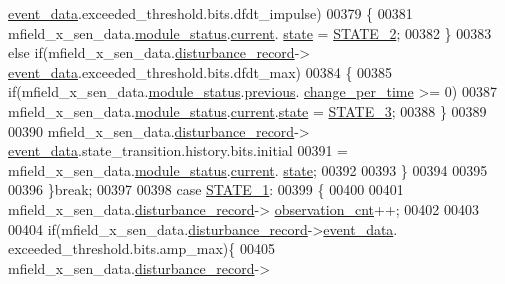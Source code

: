 \begin{DoxyCode}
      \hyperlink{a00028_a8c0bda69e71ef674e60da47ad0be9ab0}{event\_data}.exceeded\_threshold.bits.dfdt\_impulse)
00379              \{
00381                  mfield\_x\_sen\_data.\hyperlink{a00025_adfab5a5d8b45a93dfb13edb24e2b80e3}{module\_status}.\hyperlink{a00019_acf41ffc11da291c2f9f0fcb02ee72b98}{current}.
      \hyperlink{a00019_a6b8d8e916bc56265a3fd279bd26b6d1b}{state} = \hyperlink{a00021_a66fa48e832a64af4d405511cecc4c752}{STATE\_2};
00382              \}
00383              \textcolor{keywordflow}{else} \textcolor{keywordflow}{if}(mfield\_x\_sen\_data.\hyperlink{a00025_ac9b38e2c1d3f1013a88d33506c754152}{disturbance\_record}->
      \hyperlink{a00028_a8c0bda69e71ef674e60da47ad0be9ab0}{event\_data}.exceeded\_threshold.bits.dfdt\_max)
00384              \{
00385                  \textcolor{keywordflow}{if}(mfield\_x\_sen\_data.\hyperlink{a00025_adfab5a5d8b45a93dfb13edb24e2b80e3}{module\_status}.\hyperlink{a00019_adcb859b2f3983a9c58deab28e59c333f}{previous}.
      \hyperlink{a00019_a0f645dd76b41adc6a966feba8e4bff8c}{change\_per\_time} >= 0)
00387                mfield\_x\_sen\_data.\hyperlink{a00025_adfab5a5d8b45a93dfb13edb24e2b80e3}{module\_status}.\hyperlink{a00019_acf41ffc11da291c2f9f0fcb02ee72b98}{current}.\hyperlink{a00019_a6b8d8e916bc56265a3fd279bd26b6d1b}{state} = 
      \hyperlink{a00021_ad87f1bc8466a25d9f7da68717d324a22}{STATE\_3};
00388              \}
00389 
00390                  mfield\_x\_sen\_data.\hyperlink{a00025_ac9b38e2c1d3f1013a88d33506c754152}{disturbance\_record}->
      \hyperlink{a00028_a8c0bda69e71ef674e60da47ad0be9ab0}{event\_data}.state\_transition.history.bits.initial
00391                 = mfield\_x\_sen\_data.\hyperlink{a00025_adfab5a5d8b45a93dfb13edb24e2b80e3}{module\_status}.\hyperlink{a00019_acf41ffc11da291c2f9f0fcb02ee72b98}{current}.
      \hyperlink{a00019_a6b8d8e916bc56265a3fd279bd26b6d1b}{state};
00392 
00393             \}
00394 
00395 
00396         \}\textcolor{keywordflow}{break};
00397 
00398          \textcolor{keywordflow}{case} \hyperlink{a00021_a727351838367f27ac0adb9a13422c342}{STATE\_1}:
00399         \{
00400 
00401             mfield\_x\_sen\_data.\hyperlink{a00025_ac9b38e2c1d3f1013a88d33506c754152}{disturbance\_record}->
      \hyperlink{a00028_ad5b0bac02ce266b91b2b52a1c3ea1d78}{observation\_cnt}++;
00402 
00403 
00404            \textcolor{keywordflow}{if}(mfield\_x\_sen\_data.\hyperlink{a00025_ac9b38e2c1d3f1013a88d33506c754152}{disturbance\_record}->\hyperlink{a00028_a8c0bda69e71ef674e60da47ad0be9ab0}{event\_data}.
      exceeded\_threshold.bits.amp\_max)\{
00405                  mfield\_x\_sen\_data.\hyperlink{a00025_ac9b38e2c1d3f1013a88d33506c754152}{disturbance\_record}->

\end{DoxyCode}
